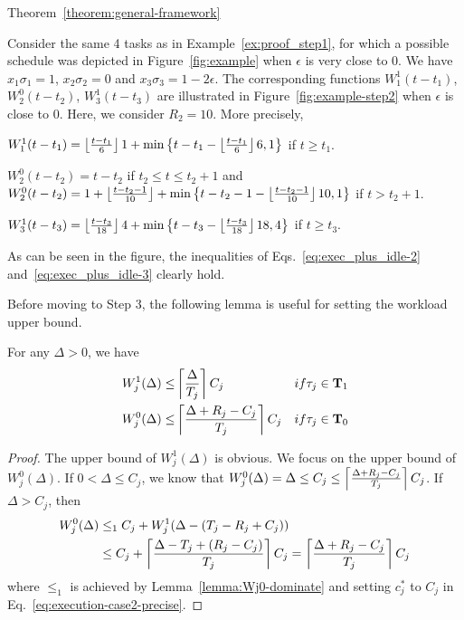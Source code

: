 \begin{appProof}{Theorem~\ref{theorem:general-framework}}
\begin{example}
Consider the same 4 tasks as in Example~\ref{ex:proof_step1}, for which a possible schedule was depicted in Figure~\ref{fig:example} when $\epsilon$ is very close to $0$. We have $x_1\sigma_1=1$, $x_2\sigma_2=0$ and $x_3\sigma_3=1-2\epsilon$. The corresponding functions
$W_1^1(t-t_1)$, $W_2^0(t-t_2)$, $W_3^1(t-t_3)$ are illustrated in
Figure~\ref{fig:example-step2} when $\epsilon$ is close to $0$. Here, we consider $R_2 = 10$. More precisely,

{\footnotesize \begin{compactitem}
  \item $W_1^1(t-t_1) = \left\lfloor{\frac{t-t_1}{6}}\right\rfloor1 + \min\left\{t-t_1-\left\lfloor{\frac{t-t_1}{6}}\right\rfloor6, 1\right\}$ if $t \geq t_1$.
  \item $W_2^0(t-t_2) = t-t_2$ if $t_2 \leq t \leq t_2 + 1$ and $W_2^0(t-t_2) = 1 + \left\lfloor{\frac{t-t_2-1}{10}}\right\rfloor + \min\left\{t-t_2-1-\left\lfloor{\frac{t-t_2-1}{10}}\right\rfloor10, 1\right\}$ if $t > t_2+1$.
  \item $W_3^1(t-t_3) = \left\lfloor{\frac{t-t_3}{18}}\right\rfloor4 + \min\left\{t-t_3-\left\lfloor{\frac{t-t_3}{18}}\right\rfloor18, 4\right\}$ if $t \geq t_3$.
\end{compactitem}
}As can be seen in the figure, the inequalities of Eqs.~\eqref{eq:exec_plus_idle-2} and~\eqref{eq:exec_plus_idle-3} clearly hold.\myendproof
\end{example}


Before moving to Step 3, the following lemma is useful for setting the workload upper bound.
\begin{Lemma}
  \label{lemma:W_0-and-W_1-upper}
For any $\Delta > 0$, we have
\begin{align}
  W_j^1(\Delta)  \leq &\ceiling{\frac{\Delta}{T_j}}C_j & \mbox{ if } \tau_j \in {\bf T}_1   \label{eq:W_1-upper}\\
  W_j^0(\Delta)  \leq &\ceiling{\frac{\Delta+R_j-C_j}{T_j}}C_j & \mbox{ if } \tau_j \in {\bf T}_0   \label{eq:W_0-upper}
\end{align}
\end{Lemma}
\begin{proof}
  The upper bound of $W_j^1(\Delta)$ is obvious. We focus on the upper bound of $W_j^0(\Delta)$. If $0 < \Delta \leq C_j$, we know that $W_j^0(\Delta) = \Delta \leq C_j \leq \left\lceil{\frac{\Delta+R_j-C_j}{T_j}}\right\rceil C_j$. If $\Delta > C_j$, then 
{\small \begin{align*}
W_j^0(\Delta) &\leq_1 C_j + W_j^1(\Delta - (T_j-R_j+C_j))\nonumber\\
& \leq C_j+\left\lceil{\frac{\Delta-T_j +(R_j-C_j)}{T_j}}\right\rceil C_j  = \left\lceil{\frac{\Delta+R_j-C_j}{T_j}}\right\rceil C_j 
\end{align*}} where $\leq_1$ is achieved by Lemma~\ref{lemma:Wj0-dominate} and setting
$c_j^*$ to $C_j$ in Eq.~\eqref{eq:execution-case2-precise}.
\end{proof}


\end{appProof}
